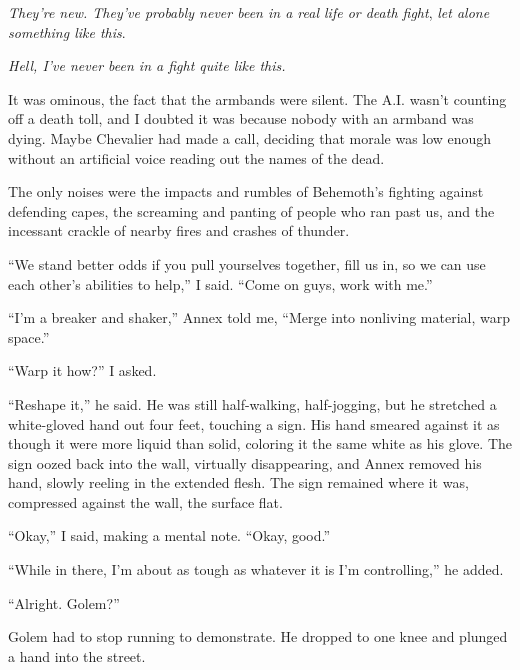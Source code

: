 \emph{They're new.  They've probably never been in a real life or death fight}, \emph{let alone something like this}.



\emph{Hell, I've never been in a fight quite like this.}



It was ominous, the fact that the armbands were silent.  The A.I. wasn't counting off a death toll, and I doubted it was because nobody with an armband was dying.  Maybe Chevalier had made a call, deciding that morale was low enough without an artificial voice reading out the names of the dead.



The only noises were the impacts and rumbles of Behemoth's fighting against defending capes, the screaming and panting of people who ran past us, and the incessant crackle of nearby fires and crashes of thunder.



``We stand better odds if you pull yourselves together, fill us in, so we can use each other's abilities to help,'' I said.  ``Come on guys, work with me.''



``I'm a breaker and shaker,'' Annex told me, ``Merge into nonliving material, warp space.''



``Warp it how?'' I asked.



``Reshape it,'' he said.  He was still half-walking, half-jogging, but he stretched a white-gloved hand out four feet, touching a sign.  His hand smeared against it as though it were more liquid than solid, coloring it the same white as his glove.  The sign oozed back into the wall, virtually disappearing, and Annex removed his hand, slowly reeling in the extended flesh.  The sign remained where it was, compressed against the wall, the surface flat.



``Okay,'' I said, making a mental note.    ``Okay, good.''



``While in there, I'm about as tough as whatever it is I'm controlling,'' he added.



``Alright.  Golem?''



Golem had to stop running to demonstrate.  He dropped to one knee and plunged a hand into the street.



